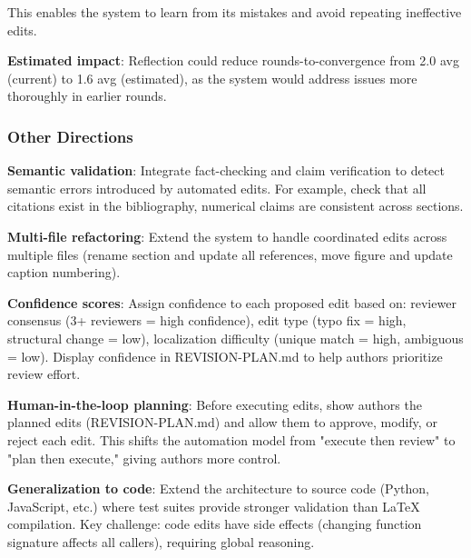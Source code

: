This enables the system to learn from its mistakes and avoid repeating ineffective edits.

\textbf{Estimated impact}: Reflection could reduce rounds-to-convergence from 2.0 avg (current) to 1.6 avg (estimated), as the system would address issues more thoroughly in earlier rounds.

\subsubsection{Other Directions}

\textbf{Semantic validation}: Integrate fact-checking and claim verification to detect semantic errors introduced by automated edits. For example, check that all citations exist in the bibliography, numerical claims are consistent across sections.

\textbf{Multi-file refactoring}: Extend the system to handle coordinated edits across multiple files (rename section and update all references, move figure and update caption numbering).

\textbf{Confidence scores}: Assign confidence to each proposed edit based on: reviewer consensus (3+ reviewers = high confidence), edit type (typo fix = high, structural change = low), localization difficulty (unique match = high, ambiguous = low). Display confidence in REVISION-PLAN.md to help authors prioritize review effort.

\textbf{Human-in-the-loop planning}: Before executing edits, show authors the planned edits (REVISION-PLAN.md) and allow them to approve, modify, or reject each edit. This shifts the automation model from "execute then review" to "plan then execute," giving authors more control.

\textbf{Generalization to code}: Extend the architecture to source code (Python, JavaScript, etc.) where test suites provide stronger validation than LaTeX compilation. Key challenge: code edits have side effects (changing function signature affects all callers), requiring global reasoning.